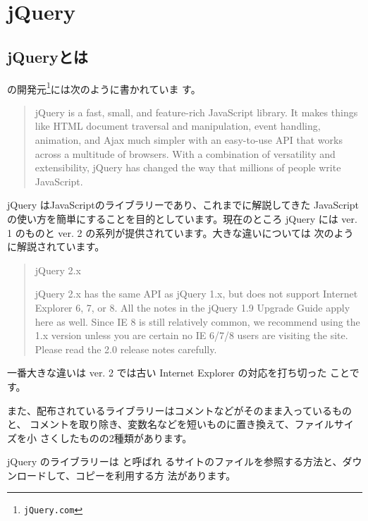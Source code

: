 \section{jQuery}
\subsection{jQueryとは}
 の開発元\footnote{\texttt{jQuery.com}}には次のように書かれていま
す。
\begin{quotation}
jQuery is a fast, small, and feature-rich JavaScript library. It makes
 things like HTML document traversal and manipulation, event handling,
 animation, and Ajax much simpler with an easy-to-use API that works
 across a multitude of browsers. With a combination of versatility and
 extensibility, jQuery has changed the way that millions of people write
 JavaScript.
\end{quotation}
jQuery はJavaScriptのライブラリーであり、これまでに解説してきた
JavaScriptの使い方を簡単にすることを目的としています。現在のところ jQuery
には ver. 1 のものと ver. 2 の系列が提供されています。大きな違いについては
次のように解説されています。
\iffalse
Query 1.x

The jQuery 1.x line had major changes as of jQuery 1.9.0. We strongly
recommend that you also use the jQuery Migrate plugin if you are
upgrading from pre-1.9 versions of jQuery or need to use plugins that
haven't yet been updated. Read the jQuery 1.9 Upgrade Guide and the
jQuery 1.9 　
\fi
\begin{quotation}
jQuery 2.x

jQuery 2.x has the same API as jQuery 1.x, but does not support Internet
Explorer 6, 7, or 8. All the notes in the jQuery 1.9 Upgrade Guide apply
here as well. Since IE 8 is still relatively common, we recommend using
the 1.x version unless you are certain no IE 6/7/8 users are visiting
the site. Please read the 2.0 release notes carefully. 
\end{quotation}
一番大きな違いは ver. 2 では古い Internet Explorer の対応を打ち切った
ことです。

また、配布されているライブラリーはコメントなどがそのまま入っているものと、
コメントを取り除き、変数名などを短いものに置き換えて、ファイルサイズを小
さくしたものの2種類があります。

jQuery のライブラリーは と呼ばれ
るサイトのファイルを参照する方法と、ダウンロードして、コピーを利用する方
法があります。 
\newcommand{\FuncRef}[1]{%
\refstepcounter{Func}\label{#1}({\bfseries 機能\arabic{Func}})}

